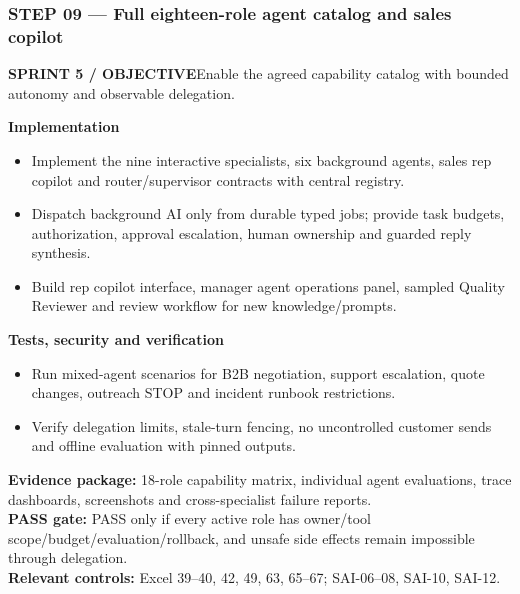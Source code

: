 \documentclass[10.5pt,a4paper,oneside]{article}
\newcommand{\eyebrow}[1]{{\sffamily\footnotesize\bfseries\color{gold}\MakeUppercase{#1}}}
\begin{document}
\subsubsection*{STEP 09 --- Full eighteen-role agent catalog and sales copilot}
\eyebrow{Sprint 5 / objective}\quad Enable the agreed capability catalog with bounded autonomy and observable delegation.
\begin{tcolorbox}[colback=warm,colframe=line,boxrule=.45pt,arc=2pt,left=8pt,right=8pt,top=6pt,bottom=6pt]\textbf{Implementation}
\begin{itemize}
\item Implement the nine interactive specialists, six background agents, sales rep copilot and router/supervisor contracts with central registry.
\item Dispatch background AI only from durable typed jobs; provide task budgets, authorization, approval escalation, human ownership and guarded reply synthesis.
\item Build rep copilot interface, manager agent operations panel, sampled Quality Reviewer and review workflow for new knowledge/prompts.
\end{itemize}
\textbf{Tests, security and verification}
\begin{itemize}
\item Run mixed-agent scenarios for B2B negotiation, support escalation, quote changes, outreach STOP and incident runbook restrictions.
\item Verify delegation limits, stale-turn fencing, no uncontrolled customer sends and offline evaluation with pinned outputs.
\end{itemize}
\textbf{Evidence package:} 18-role capability matrix, individual agent evaluations, trace dashboards, screenshots and cross-specialist failure reports.\\
\textbf{PASS gate:} PASS only if every active role has owner/tool scope/budget/evaluation/rollback, and unsafe side effects remain impossible through delegation.\\
\textbf{Relevant controls:} Excel 39--40, 42, 49, 63, 65--67; SAI-06--08, SAI-10, SAI-12.
\end{tcolorbox}
\Needspace{100mm}
\end{document}
